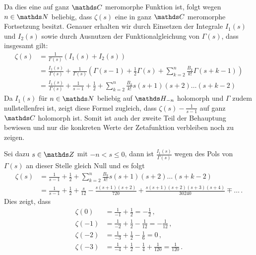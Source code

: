 \begin{bewe}
Da dies eine auf ganz $\CC$ meromorphe Funktion ist, folgt wegen $n \in \NN$ beliebig, dass $\zeta (s)$ eine in ganz $\CC$ meromorphe Fortsetzung besitzt. Genauer erhalten wir durch Einsetzen der Integrale $I_1(s)$ und $I_2(s)$ sowie durch Ausnutzen der Funktionalgleichung von $\Gamma(s)$, dass insgesamt gilt:
\begin{align*}
	\zeta(s) 
	&= \frac 1{\Gamma(s)} \left( I_1(s) + I_2(s) \right) \\
	&= \frac {I_1(s)}{\Gamma(s)} + \frac 1{\Gamma(s)} \left( \Gamma(s-1) + \frac 12 \Gamma(s) + \sum_{k=2}^n \frac {B_k}{k!} \Gamma(s+k-1) \right) \\
	&= \frac {I_1(s)}{\Gamma(s)} + \frac 1{s-1} + \frac 12 + \sum_{k=2}^n \frac{B_k}{k!} s(s+1)(s+2)\ldots(s+k-2)
\end{align*}
Da $I_1(s)$ für $n \in \NN$ beliebig auf $\HH_{-n}$ holomorph und $\Gamma$ zudem nullstellenfrei ist, zeigt diese Formel zugleich, dass $\zeta(s) - \frac 1{s-1}$ auf ganz $\CC$ holomorph ist. Somit ist auch der zweite Teil der Behauptung bewiesen und nur die konkreten Werte der Zetafunktion verbleiben noch zu zeigen.

Sei dazu $s \in \ZZ$ mit $-n < s \leq 0$, dann ist $\frac {I_1(s)}{\Gamma(s)}$ wegen des Pols von $\Gamma(s)$ an dieser Stelle gleich Null und es folgt
\begin{align*}
	\zeta(s) 
	&= \frac 1{s-1} + \frac 12 + \sum_{k=2}^n \frac{B_k}{k!} s(s+1)(s+2)\ldots(s+k-2) \\
	&= \frac 1{s-1} + \frac 12 + \frac s{12} - \frac {s(s+1)(s+2)}{720} + \frac {s(s+1)(s+2)(s+3)(s+4)}{30240} \mp \ldots
	\,.
\end{align*}
Dies zeigt, dass 
\begin{align*}
	\zeta(0) &= \frac 1{-1} + \frac 12 = - \frac 12 \,, \\
	\zeta(-1) &= \frac 1{-2} + \frac 12 - \frac 1{12} = -\frac 1{12} \,, \\
	\zeta(-2) &= \frac 1{-3} + \frac 12 - \frac 16 = 0 \,, \\
	\zeta(-3) &= \frac 1{-4} + \frac 12 - \frac 14 + \frac 1{120} = \frac 1{120} \,.
\end{align*}

\end{bewe}
